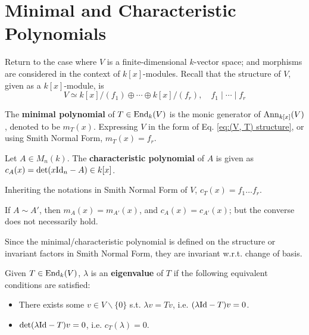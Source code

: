 \section{Minimal and Characteristic Polynomials}

Return to the case where $V$ is a finite-dimensional $k$-vector space; and morphisms are considered in the context of $k[x]$-modules. Recall that the structure of $V$, given as a $k[x]$-module, is 
\[
    V \simeq k[x]/(f_1) \oplus \cdots \oplus k[x]/(f_r), \quad f_1 \mid \cdots \mid f_r
\]

\begin{definition}
    The \textbf{minimal polynomial} of $T\in \mathrm{End}_{k}(V)$ is the monic generator of $\mathrm{Ann}_{k[x]}(V)$, denoted to be $m_T(x)$. Expressing $V$ in the form of Eq. \eqref{eq:(V, T) structure}, or using Smith Normal Form, $m_T(x) = f_r$.
\end{definition}

\begin{definition}
    Let $A \in M_n(k)$. The \textbf{characteristic polynomial} of $A$ is given as $c_A(x) = \det(x\mathrm{Id}_n - A) \in k[x]$. 
\end{definition}

\begin{remark}
    Inheriting the notations in Smith Normal Form of $V$, $c_T(x) = f_1\ldots f_r$.
\end{remark}

\begin{remark}
    If $A \sim A'$, then $m_A(x) = m_{A'}(x)$, and $c_A(x) = c_{A'}(x)$; but the converse does not necessarily hold.
\end{remark}

\begin{remark}
    Since the minimal/characteristic polynomial is defined on the structure or invariant factors in Smith Normal Form, they are invariant w.r.t. change of basis.
\end{remark}

\begin{definition}[Eigenvalue]
    Given $T \in \mathrm{End}_k(V)$, $\lambda$ is an \textbf{eigenvalue} of $T$ if the following equivalent conditions are satisfied:
    \begin{itemize}
        \item There exists some $v\in V \smallsetminus\{0\}$ s.t. $\lambda v = T v$, i.e. $(\lambda \mathrm{Id} - T)v = 0$.
        \item $\det(\lambda \mathrm{Id} - T)v = 0$, i.e. $c_T(\lambda) = 0$.
    \end{itemize}
\end{definition}

